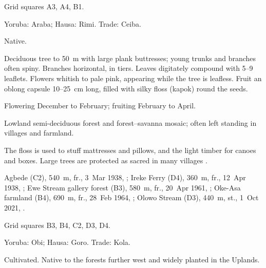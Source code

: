  Grid squares A3, A4, B1.

\begin{center}
\end{center}

\label{sp:MAL02}

 

 Yoruba: Araba; Hausa: Rimi. Trade:
Ceiba.

 Native.

 Deciduous tree to 50~m with large plank
buttresses; young trunks and branches often spiny. Branches
horizontal, in tiers. Leaves digitately compound with 5--9 leaflets.
Flowers whitish to pale pink, appearing while the tree is leafless.
Fruit an oblong capsule 10--25~cm long, filled with silky floss
(kapok) round the seeds.

 Flowering December to February; fruiting February
to April.

 Lowland semi-deciduous forest and forest--savanna
mosaic; often left standing in villages and farmland.

 The floss is used to stuff mattresses and pillows, and
the light timber for canoes and boxes. Large trees are protected as
sacred in many villages \citep{burkill1985,keay1989}.

 Agbede (C2), 540~m, fr., 3~Mar 1938, ;
Ireke Ferry (D4), 360~m, fr., 12~Apr 1938, ;
Ewe Stream gallery forest (B3), 580~m, fr., 20~Apr 1961, ;
Oke-Asa farmland (B4), 690~m, fr., 28~Feb 1964, ;
Olowo Stream (D3), 440~m, st., 1~Oct 2021, .

 Grid squares B3, B4, C2, D3, D4.

\begin{center}
\end{center}

\label{sp:MAL03}

 

 Yoruba: Obi; Hausa: Goro. Trade: Kola.

 Cultivated. Native to the forests further west and
widely planted in the Uplands.

